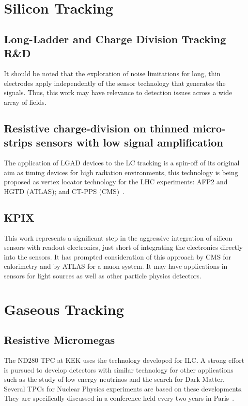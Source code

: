 \section{Silicon Tracking}
\subsection{Long-Ladder and Charge Division Tracking R\&D}

It should be noted that the exploration of noise limitations for long, thin electrodes apply independently
of the sensor technology that generates the signals. Thus, this work may have
relevance to detection issues across a wide array of fields.

\subsection{Resistive charge-division on thinned micro-strips sensors with low signal amplification}
The application of LGAD devices to the LC tracking is a spin-off of its original aim as timing devices for high radiation environments, this technology is being proposed as vertex locator technology for the LHC experiments: AFP2 and HGTD (ATLAS); and CT-PPS (CMS)~\cite{Sadrozinski:CPAD2015}.

\subsection{KPIX}
This work represents a significant step in the aggressive integration of silicon sensors with readout electronics, just short of integrating the electronics directly into the sensors. It has prompted consideration of this approach by CMS for calorimetry and by ATLAS for a muon system.  It may have applications in sensors for light sources as well as other particle physics detectors.

\section{Gaseous Tracking}
\subsection{Resistive Micromegas}
The ND280 TPC at KEK uses the technology developed for ILC.
A strong effort is pursued to develop detectors with similar technology for other applications such as
the study of low energy neutrinos and the search for Dark Matter.
Several TPCs for Nuclear Physics experiments are based on these developments. They are specifically discussed in a
conference held every two years in Paris~\cite{Irastorza:2013mxa}.

